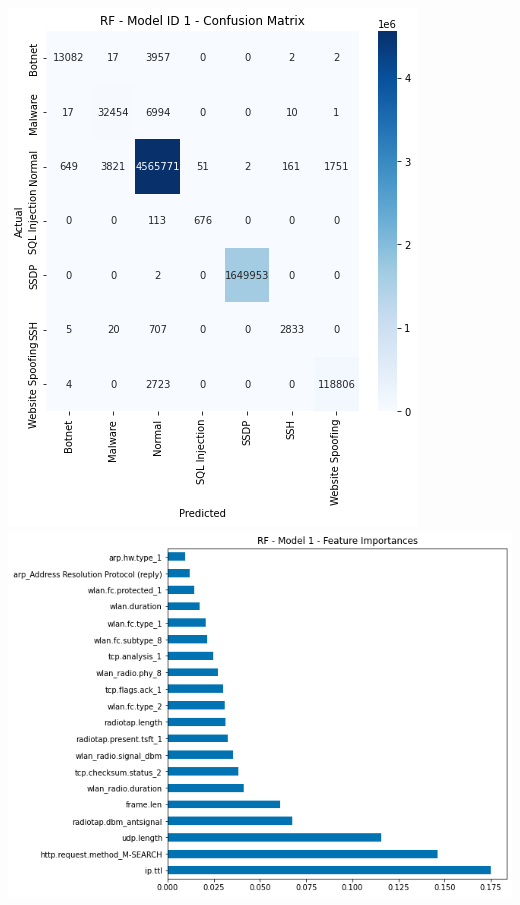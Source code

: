 \begin{appendices}
\begin{center}
	\includegraphics[width=\textwidth]{Appendices/Images/RF/Model1/RF_Model1_CM.png}
	\includegraphics[width=\textwidth]{Appendices/Images/RF/Model1/RF_Model1_FI.png}
\end{center}


\end{appendices}
